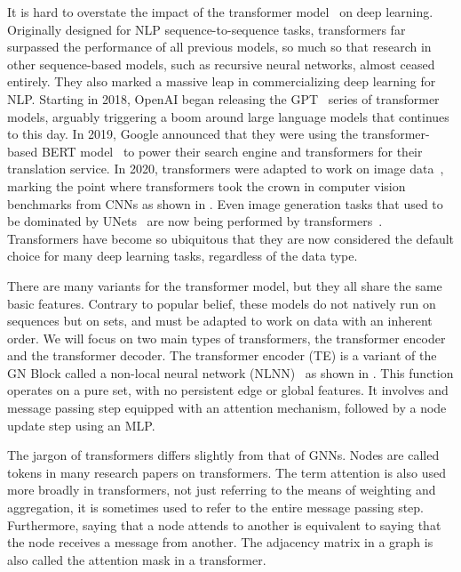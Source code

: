 It is hard to overstate the impact of the transformer model~\cite{Attention} on deep learning.
Originally designed for NLP sequence-to-sequence tasks, transformers far surpassed the performance of all previous models, so much so that research in other sequence-based models, such as recursive neural networks, almost ceased entirely.
They also marked a massive leap in commercializing deep learning for NLP.
Starting in 2018, OpenAI began releasing the GPT~\cite{GPT} series of transformer models, arguably triggering a boom around large language models that continues to this day.
In 2019, Google announced that they were using the transformer-based BERT model~\cite{BERT} to power their search engine and transformers for their translation service.
In 2020, transformers were adapted to work on image data~\cite{VisionTransformer}, marking the point where transformers took the crown in computer vision benchmarks from CNNs as shown in .
Even image generation tasks that used to be dominated by UNets~\cite{Unet, DiffusionBeatsGANS} are now being performed by transformers~\cite{DIT, SD3}.
Transformers have become so ubiquitous that they are now considered the default choice for many deep learning tasks, regardless of the data type.

There are many variants for the transformer model, but they all share the same basic features.
Contrary to popular belief, these models do not natively run on sequences but on sets, and must be adapted to work on data with an inherent order.
We will focus on two main types of transformers, the transformer encoder and the transformer decoder.
The transformer encoder (TE) is a variant of the GN Block called a non-local neural network (NLNN)~\cite{NonlocalNeuralNetworks} as shown in .
This function operates on a pure set, with no persistent edge or global features.
It involves and message passing step equipped with an attention mechanism, followed by a node update step using an MLP\@.

The jargon of transformers differs slightly from that of GNNs.
Nodes are called tokens in many research papers on transformers.
The term attention is also used more broadly in transformers, not just referring to the means of weighting and aggregation, it is sometimes used to refer to the entire message passing step.
Furthermore, saying that a node attends to another is equivalent to saying that the node receives a message from another.
The adjacency matrix in a graph is also called the attention mask in a transformer.

